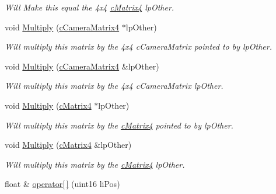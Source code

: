 \begin{DoxyCompactItemize}
\begin{DoxyCompactList}\small\item\em Will Make this equal the 4x4 \hyperlink{classc_matrix4}{cMatrix4} lpOther. \end{DoxyCompactList}\item 
\hypertarget{classc_camera_matrix4_a3856050392bac0f5391a280acc7e1f45}{
void \hyperlink{classc_camera_matrix4_a3856050392bac0f5391a280acc7e1f45}{Multiply} (\hyperlink{classc_camera_matrix4}{cCameraMatrix4} $\ast$lpOther)}
\label{classc_camera_matrix4_a3856050392bac0f5391a280acc7e1f45}

\begin{DoxyCompactList}\small\item\em Will multiply this matrix by the 4x4 cCameraMatrix pointed to by lpOther. \end{DoxyCompactList}\item 
\hypertarget{classc_camera_matrix4_a7a539cb44fa348ad19408ddcb928c49c}{
void \hyperlink{classc_camera_matrix4_a7a539cb44fa348ad19408ddcb928c49c}{Multiply} (\hyperlink{classc_camera_matrix4}{cCameraMatrix4} \&lpOther)}
\label{classc_camera_matrix4_a7a539cb44fa348ad19408ddcb928c49c}

\begin{DoxyCompactList}\small\item\em Will multiply this matrix by the 4x4 cCameraMatrix lpOther. \end{DoxyCompactList}\item 
\hypertarget{classc_camera_matrix4_a7d72fd4af4f6c427a71e7084a10ca1b3}{
void \hyperlink{classc_camera_matrix4_a7d72fd4af4f6c427a71e7084a10ca1b3}{Multiply} (\hyperlink{classc_matrix4}{cMatrix4} $\ast$lpOther)}
\label{classc_camera_matrix4_a7d72fd4af4f6c427a71e7084a10ca1b3}

\begin{DoxyCompactList}\small\item\em Will multiply this matrix by the \hyperlink{classc_matrix4}{cMatrix4} pointed to by lpOther. \end{DoxyCompactList}\item 
\hypertarget{classc_camera_matrix4_a81a6d3f77fb020b58ea788b42f581905}{
void \hyperlink{classc_camera_matrix4_a81a6d3f77fb020b58ea788b42f581905}{Multiply} (\hyperlink{classc_matrix4}{cMatrix4} \&lpOther)}
\label{classc_camera_matrix4_a81a6d3f77fb020b58ea788b42f581905}

\begin{DoxyCompactList}\small\item\em Will multiply this matrix by the \hyperlink{classc_matrix4}{cMatrix4} lpOther. \end{DoxyCompactList}\item 
\hypertarget{classc_camera_matrix4_ad9cd70439ad670a7ecc0e9198b5e0516}{
float \& \hyperlink{classc_camera_matrix4_ad9cd70439ad670a7ecc0e9198b5e0516}{operator\mbox{[}$\,$\mbox{]}} (uint16 liPos)}
\label{classc_camera_matrix4_ad9cd70439ad670a7ecc0e9198b5e0516}


\end{DoxyCompactItemize}
